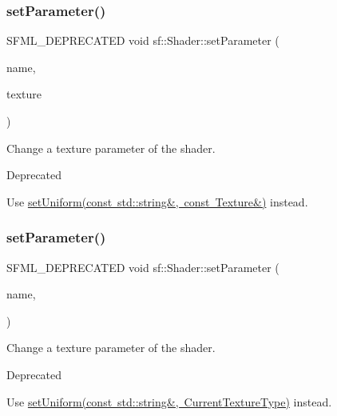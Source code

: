 \subsubsection{\texorpdfstring{setParameter()}{setParameter()}\hspace{0.1cm}{\footnotesize\ttfamily [9/10]}}
{\footnotesize\ttfamily S\+F\+M\+L\+\_\+\+D\+E\+P\+R\+E\+C\+A\+T\+ED void sf\+::\+Shader\+::set\+Parameter (\begin{DoxyParamCaption}\item[{const std\+::string \&}]{name,  }\item[{const \mbox{\hyperlink{classsf_1_1_texture}{Texture}} \&}]{texture }\end{DoxyParamCaption})}



Change a texture parameter of the shader. 

\begin{DoxyRefDesc}{Deprecated}
\item[\mbox{\hyperlink{deprecated__deprecated000014}{Deprecated}}]Use \mbox{\hyperlink{classsf_1_1_shader_a7806a29ffbd0ee9251256a9e7265d479}{set\+Uniform(const std\+::string\&, const Texture\&)}} instead. \end{DoxyRefDesc}
\begin{DoxyVerb}\end{DoxyVerb}
 \mbox{\label{classsf_1_1_shader_a0fa7ecad14206e4d5edae1d6aa87f553}} 
\subsubsection{\texorpdfstring{setParameter()}{setParameter()}\hspace{0.1cm}{\footnotesize\ttfamily [10/10]}}
{\footnotesize\ttfamily S\+F\+M\+L\+\_\+\+D\+E\+P\+R\+E\+C\+A\+T\+ED void sf\+::\+Shader\+::set\+Parameter (\begin{DoxyParamCaption}\item[{const std\+::string \&}]{name,  }\item[{\mbox{\hyperlink{structsf_1_1_shader_1_1_current_texture_type}{Current\+Texture\+Type}}}]{ }\end{DoxyParamCaption})}



Change a texture parameter of the shader. 

\begin{DoxyRefDesc}{Deprecated}
\item[\mbox{\hyperlink{deprecated__deprecated000015}{Deprecated}}]Use \mbox{\hyperlink{classsf_1_1_shader_ab18f531e1f726b88fec1cf5a1e6af26d}{set\+Uniform(const std\+::string\&, Current\+Texture\+Type)}} instead. \end{DoxyRefDesc}
\begin{DoxyVerb}\end{DoxyVerb}
 \mbox{\label{classsf_1_1_shader_abf78e3bea1e9b0bab850b6b0a0de29c7}} 
